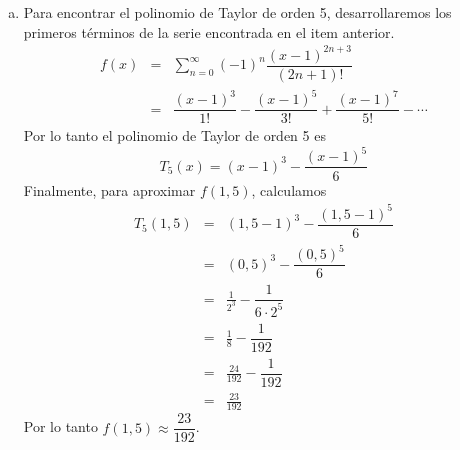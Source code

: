 \documentclass{article}
\begin{document}
\begin{enumerate}[a)]
  \item Para encontrar el polinomio de Taylor de orden 5, desarrollaremos los primeros términos de la serie encontrada en el item anterior.
    \begin{eqnarray*}
      f(x) 
        &=& \sum_{n=0}^{\infty}(-1)^n\dfrac{(x-1)^{2n+3}}{(2n+1)!}\\
        &=& \dfrac{(x-1)^3}{1!}-\dfrac{(x-1)^5}{3!}+\dfrac{(x-1)^7}{5!}-\cdots
    \end{eqnarray*}
    Por lo tanto el polinomio de Taylor de orden 5 es
    $$T_5(x)= (x-1)^3-\dfrac{(x-1)^5}{6}$$
    Finalmente, para aproximar $f(1,5)$, calculamos
    \begin{eqnarray*}
      T_5(1,5) 
        &=& (1,5-1)^3-\dfrac{(1,5-1)^5}{6}\\
        &=& (0,5)^3-\dfrac{(0,5)^5}{6}\\
        &=& \frac{1}{2^3}-\dfrac{1}{6\cdot 2^5}\\
        &=& \frac{1}{8}-\dfrac{1}{192}\\
        &=& \frac{24}{192}-\dfrac{1}{192}\\
        &=& \frac{23}{192}
    \end{eqnarray*}
    Por lo tanto $f(1,5)\approx \dfrac{23}{192}$.%
\end{enumerate}
\end{document}

